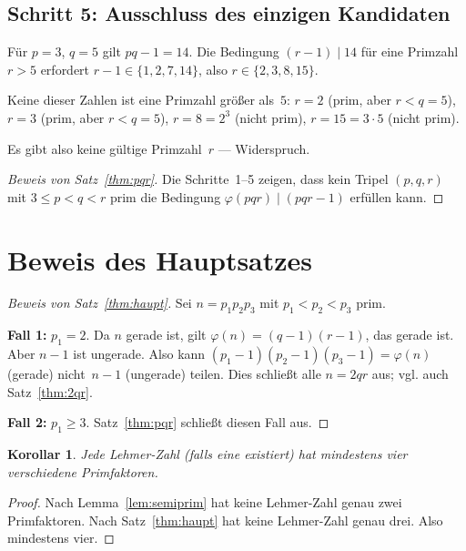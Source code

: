 \documentclass[12pt,a4paper]{amsart}
\newtheorem{corollary}[theorem]{Korollar}
\theoremstyle{definition}
\newcommand{\euler}{\varphi}
\begin{document}
\subsection{Schritt 5: Ausschluss des einzigen Kandidaten}

Für $p = 3$, $q = 5$ gilt $pq - 1 = 14$. Die Bedingung $(r-1) \mid 14$ für eine Primzahl
$r > 5$ erfordert $r - 1 \in \{1, 2, 7, 14\}$, also $r \in \{2, 3, 8, 15\}$.

Keine dieser Zahlen ist eine Primzahl größer als~$5$:
$r = 2$ (prim, aber $r < q = 5$), $r = 3$ (prim, aber $r < q = 5$),
$r = 8 = 2^3$ (nicht prim), $r = 15 = 3 \cdot 5$ (nicht prim).

Es gibt also keine gültige Primzahl~$r$ — Widerspruch.

\begin{proof}[Beweis von Satz~\ref{thm:pqr}]
Die Schritte~1--5 zeigen, dass kein Tripel $(p, q, r)$ mit $3 \le p < q < r$
prim die Bedingung $\euler(pqr) \mid (pqr - 1)$ erfüllen kann. \qedhere
\end{proof}

\section{Beweis des Hauptsatzes}

\begin{proof}[Beweis von Satz~\ref{thm:haupt}]
Sei $n = p_1 p_2 p_3$ mit $p_1 < p_2 < p_3$ prim.

\textbf{Fall 1:} $p_1 = 2$. Da $n$ gerade ist, gilt $\euler(n) = (q-1)(r-1)$, das gerade ist.
Aber $n - 1$ ist ungerade. Also kann $(p_1-1)(p_2-1)(p_3-1) = \euler(n)$ (gerade) nicht~$n-1$ (ungerade) teilen.
Dies schließt alle $n = 2qr$ aus; vgl. auch Satz~\ref{thm:2qr}.

\textbf{Fall 2:} $p_1 \ge 3$. Satz~\ref{thm:pqr} schließt diesen Fall aus.
\end{proof}

\begin{corollary}
\label{cor:vierprim}
Jede Lehmer-Zahl (falls eine existiert) hat mindestens \emph{vier}
verschiedene Primfaktoren.
\end{corollary}

\begin{proof}
Nach Lemma~\ref{lem:semiprim} hat keine Lehmer-Zahl genau zwei Primfaktoren.
Nach Satz~\ref{thm:haupt} hat keine Lehmer-Zahl genau drei. Also mindestens vier.
\end{proof}
\end{document}
